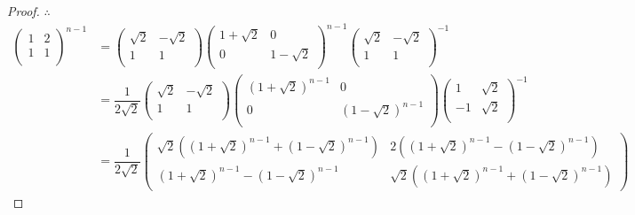 \documentclass[color=black,device=normal,lang=cn,mode=geye]{elegantnote}
\begin{document}
\begin{proof}
    $\therefore$
    \begin{align*}
        \begin{pmatrix}
            1 & 2 \\
            1 & 1 \\
        \end{pmatrix}^{n-1} & =\begin{pmatrix}
            \sqrt{2} & -\sqrt{2} \\
            1 & 1 \\
        \end{pmatrix}\begin{pmatrix}
            1+\sqrt{2} & 0 \\
            0 & 1-\sqrt{2} \\
        \end{pmatrix}^{n-1}\begin{pmatrix}
            \sqrt{2} & -\sqrt{2} \\
            1 & 1 \\
        \end{pmatrix}^{-1} \\
        & =\dfrac{1}{2\sqrt{2}}\begin{pmatrix}
            \sqrt{2} & -\sqrt{2} \\
            1 & 1 \\
        \end{pmatrix}\begin{pmatrix}
            (1+\sqrt{2})^{n-1} & 0 \\
            0 & (1-\sqrt{2})^{n-1} \\
        \end{pmatrix}\begin{pmatrix}
            1 & \sqrt{2} \\
            -1 & \sqrt{2} \\
        \end{pmatrix}^{-1} \\
        & =\dfrac{1}{2\sqrt{2}}\begin{pmatrix}
            \sqrt{2}((1+\sqrt{2})^{n-1}+(1-\sqrt{2})^{n-1}) & 2((1+\sqrt{2})^{n-1}-(1-\sqrt{2})^{n-1}) \\
            (1+\sqrt{2})^{n-1}-(1-\sqrt{2})^{n-1} & \sqrt{2}((1+\sqrt{2})^{n-1}+(1-\sqrt{2})^{n-1})
        \end{pmatrix}
    \end{align*}


\end{proof}
\end{document}
